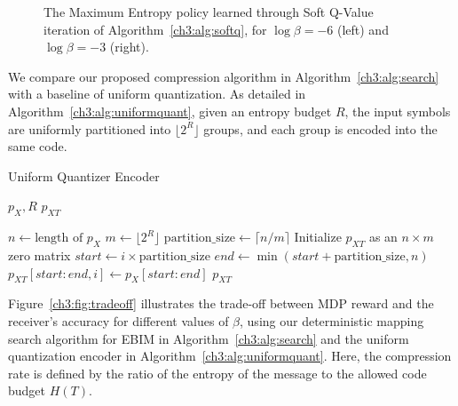\begin{figure}[ht]
\begin{minipage}[b]{0.48\linewidth}
    \end{minipage}
    \vspace{5pt}
    \caption{The Maximum Entropy policy learned through Soft Q-Value iteration of Algorithm~\ref{ch3:alg:softq}, for $\log\beta=-6$ (left) and $\log\beta=-3$ (right).}\label{ch3:fig:twobetas}
\end{figure}
\FloatBarrier

We compare our proposed compression algorithm in Algorithm~\ref{ch3:alg:search} with a baseline of uniform quantization. As detailed in Algorithm~\ref{ch3:alg:uniformquant}, given an entropy budget $R$, the input symbols are uniformly partitioned into $\lfloor 2^R \rfloor$ groups, and each group is encoded into the same code.

\begin{algorithm}
\caption{Uniform Quantizer Encoder}\label{ch3:alg:uniformquant}
\begin{algorithmic}[1] 
    \Require $p_X, R$
    \Ensure $p_{XT}$

    \State $n \gets \text{length of } p_X$
    \State $m \gets \lfloor 2^R \rfloor$ 
    \State $\text{partition\_size} \gets \lceil n / m \rceil$
    \State Initialize $p_{XT}$ as an $n \times m$ zero matrix
        \State $start \gets i \times \text{partition\_size}$
        \State $end \gets \min(start + \text{partition\_size}, n)$
        \State $p_{XT}[start:end, i] \gets p_X[start:end]$
    \EndFor
    \State\Return $p_{XT}$      
\end{algorithmic}
\end{algorithm}

Figure~\ref{ch3:fig:tradeoff} illustrates the trade-off between MDP reward and the receiver's accuracy for different values of \(\beta\), using our deterministic mapping search algorithm for EBIM in Algorithm~\ref{ch3:alg:search} and the uniform quantization encoder in Algorithm~\ref{ch3:alg:uniformquant}. Here, the compression rate is defined by the ratio of the entropy of the message to the allowed code budget \(H(T)\).

